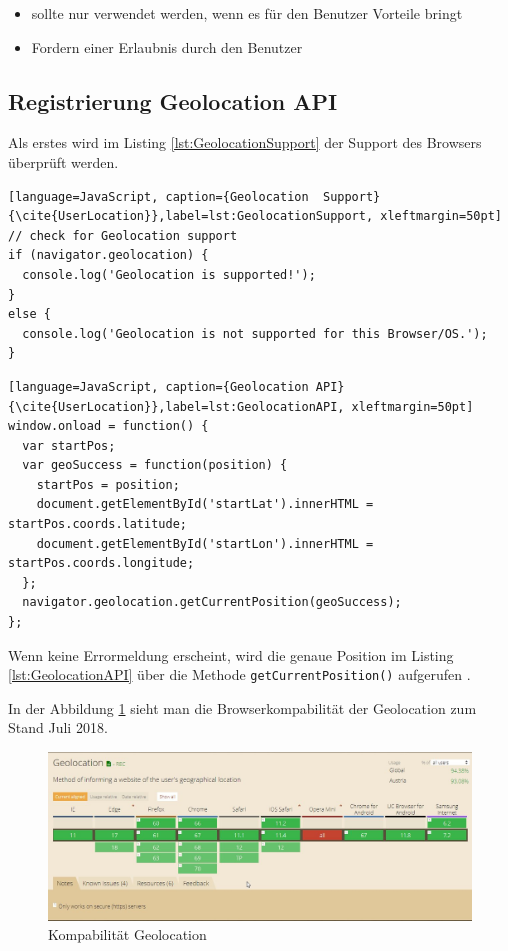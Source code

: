 \begin{itemize}
    \item  sollte nur verwendet werden, wenn es für den Benutzer Vorteile bringt 
	\item  Fordern einer Erlaubnis durch den Benutzer  
\end{itemize}


\subsection{Registrierung Geolocation API}
Als erstes wird im Listing \ref{lst:GeolocationSupport}  der Support des Browsers überprüft werden.


\begin{lstlisting}[language=JavaScript, caption={Geolocation  Support} {\cite{UserLocation}},label=lst:GeolocationSupport, xleftmargin=50pt]
// check for Geolocation support
if (navigator.geolocation) {
  console.log('Geolocation is supported!');
}
else {
  console.log('Geolocation is not supported for this Browser/OS.');
}
\end{lstlisting}

\begin{lstlisting}[language=JavaScript, caption={Geolocation API} {\cite{UserLocation}},label=lst:GeolocationAPI, xleftmargin=50pt]
window.onload = function() {
  var startPos;
  var geoSuccess = function(position) {
    startPos = position;
    document.getElementById('startLat').innerHTML = startPos.coords.latitude;
    document.getElementById('startLon').innerHTML = startPos.coords.longitude;
  };
  navigator.geolocation.getCurrentPosition(geoSuccess);
};
\end{lstlisting}

Wenn keine Errormeldung erscheint, wird die genaue Position im Listing \ref{lst:GeolocationAPI} über die Methode \texttt{getCurrentPosition()}  aufgerufen \cite{UserLocation}.
\newpage

In der Abbildung \ref{fig:BrowserGL} sieht man die Browserkompabilität der Geolocation zum Stand Juli 2018.
\begin{figure}[h]
	\centering
	\includegraphics[width=14cm]{BilderAllgemein/BrowserGL}\medskip
	\caption{Kompabilität Geolocation \cite{BrowserSupport}}
	\label{fig:BrowserGL}
\end{figure}









